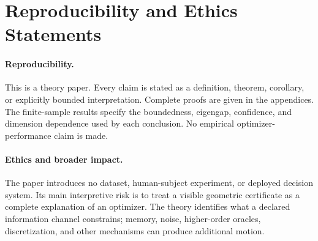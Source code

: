\section{Reproducibility and Ethics Statements}
\label{sec:statements}

\paragraph{Reproducibility.}
This is a theory paper.  Every claim is stated as a definition, theorem,
corollary, or explicitly bounded interpretation.  Complete proofs are given
in the appendices.  The finite-sample results specify the boundedness,
eigengap, confidence, and dimension dependence used by each conclusion.  No
empirical optimizer-performance claim is made.

\paragraph{Ethics and broader impact.}
The paper introduces no dataset, human-subject experiment, or deployed
decision system.  Its main interpretive risk is to treat a visible geometric
certificate as a complete explanation of an optimizer.  The theory identifies
what a declared information channel constrains; memory, noise, higher-order
oracles, discretization, and other mechanisms can produce additional motion.
